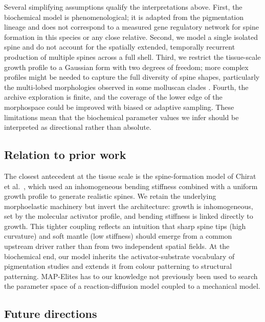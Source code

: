 \documentclass[11pt]{article}
\begin{document}
Several simplifying assumptions qualify the interpretations above. First,
the biochemical model is phenomenological; it is adapted from the
pigmentation lineage \citep{fowler1992modeling,meinhardt1987model} and
does not correspond to a measured gene regulatory network for spine
formation in this species or any close relative. Second, we model a
single isolated spine and do not account for the spatially extended,
temporally recurrent production of multiple spines across a full shell.
Third, we restrict the tissue-scale growth profile to a Gaussian form with
two degrees of freedom; more complex profiles might be needed to capture
the full diversity of spine shapes, particularly the multi-lobed
morphologies observed in some molluscan clades
\citep{chirat2013mechanical}. Fourth, the archive exploration is finite,
and the coverage of the lower edge of the morphospace could be improved
with biased or adaptive sampling. These limitations mean that the
biochemical parameter values we infer should be interpreted as directional
rather than absolute.

\subsection{Relation to prior work}

The closest antecedent at the tissue scale is the spine-formation model of
Chirat et al.\ \citep{chirat2013mechanical}, which used an inhomogeneous
bending stiffness combined with a uniform growth profile to generate
realistic spines. We retain the underlying morphoelastic machinery but
invert the architecture: growth is inhomogeneous, set by the molecular
activator profile, and bending stiffness is linked directly to growth.
This tighter coupling reflects an intuition that sharp spine tips
(high curvature) and soft mantle (low stiffness) should emerge from a
common upstream driver rather than from two independent spatial fields.
At the biochemical end, our model inherits the activator-substrate
vocabulary of pigmentation studies
\citep{fowler1992modeling,meinhardt1987model} and extends it from
colour patterning to structural patterning. MAP-Elites
\citep{mouret2015illuminating} has to our knowledge not previously been
used to search the parameter space of a reaction-diffusion model coupled
to a mechanical model.

\subsection{Future directions}
\end{document}
